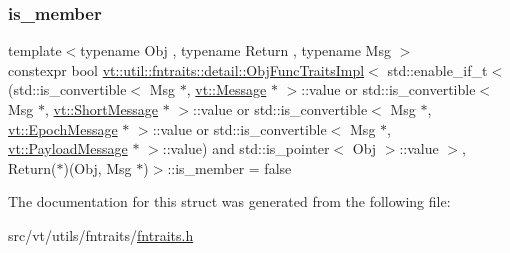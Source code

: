 \subsubsection{\texorpdfstring{is\+\_\+member}{is\_member}}
{\footnotesize\ttfamily template$<$typename Obj , typename Return , typename Msg $>$ \\
constexpr bool \hyperlink{structvt_1_1util_1_1fntraits_1_1detail_1_1_obj_func_traits_impl}{vt\+::util\+::fntraits\+::detail\+::\+Obj\+Func\+Traits\+Impl}$<$ std\+::enable\+\_\+if\+\_\+t$<$(std\+::is\+\_\+convertible$<$ Msg $\ast$, \hyperlink{namespacevt_a3a3ddfef40b4c90915fa43cdd5f129ea}{vt\+::\+Message} $\ast$ $>$\+::value or std\+::is\+\_\+convertible$<$ Msg $\ast$, \hyperlink{namespacevt_a1125ac1da6c0bbf141e0ea0739d7602d}{vt\+::\+Short\+Message} $\ast$ $>$\+::value or std\+::is\+\_\+convertible$<$ Msg $\ast$, \hyperlink{namespacevt_ad67368ffae52d7325002586b41bb150e}{vt\+::\+Epoch\+Message} $\ast$ $>$\+::value or std\+::is\+\_\+convertible$<$ Msg $\ast$, \hyperlink{namespacevt_a89a92229c5622b855c02c549f83a1a68}{vt\+::\+Payload\+Message} $\ast$ $>$\+::value) and std\+::is\+\_\+pointer$<$ Obj $>$\+::value $>$, Return($\ast$)(Obj, Msg $\ast$)$>$\+::is\+\_\+member = false\hspace{0.3cm}{\ttfamily [static]}}



The documentation for this struct was generated from the following file\+:\begin{DoxyCompactItemize}
\item 
src/vt/utils/fntraits/\hyperlink{fntraits_8h}{fntraits.\+h}\end{DoxyCompactItemize}
